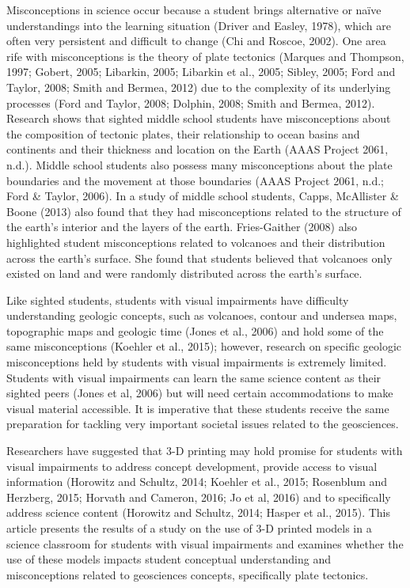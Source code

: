 \documentclass[11.5pt]{sig-alternate} %
\begin{document}
\begin{large}
Misconceptions in science occur because a student brings alternative or naïve understandings into the learning situation (Driver and Easley, 1978), which are often very persistent and difficult to change (Chi and Roscoe, 2002).  One area rife with misconceptions is the theory of plate tectonics (Marques and Thompson, 1997; Gobert, 2005; Libarkin, 2005; Libarkin et al., 2005; Sibley, 2005; Ford and Taylor, 2008; Smith and Bermea, 2012) due to the complexity of its underlying processes (Ford and Taylor, 2008; Dolphin, 2008; Smith and Bermea, 2012).  Research shows that sighted middle school students have misconceptions about the composition of tectonic plates, their relationship to ocean basins and continents and their thickness and location on the Earth (AAAS Project 2061, n.d.).  Middle school students also possess many misconceptions about the plate boundaries and the movement at those boundaries (AAAS Project 2061, n.d.; Ford \& Taylor, 2006).  In a study of middle school students, Capps, McAllister \& Boone (2013) also found that they had misconceptions related to the structure of the earth’s interior and the layers of the earth.  Fries-Gaither (2008) also highlighted student misconceptions related to volcanoes and their distribution across the earth’s surface.  She found that students believed that volcanoes only existed on land and were randomly distributed across the earth’s surface.  

Like sighted students, students with visual impairments have difficulty understanding geologic concepts, such as volcanoes, contour and undersea maps, topographic maps and geologic time (Jones et al., 2006) and hold some of the same misconceptions (Koehler et al., 2015); however, research on specific geologic misconceptions held by students with visual impairments is extremely limited.  Students with visual impairments can learn the same science content as their sighted peers (Jones et al, 2006) but will need certain accommodations to make visual material accessible.  It is imperative that these students receive the same preparation for tackling very important societal issues related to the geosciences.   

Researchers have suggested that 3-D printing may hold promise for students with visual impairments to address concept development, provide access to visual information (Horowitz and Schultz, 2014; Koehler et al., 2015; Rosenblum and Herzberg, 2015; Horvath and Cameron, 2016; Jo et al, 2016) and to specifically address science content (Horowitz and Schultz, 2014; Hasper et al., 2015). This article presents the results of a study on the use of 3-D printed models in a science classroom for students with visual impairments and examines whether the use of these models impacts student conceptual understanding and misconceptions related to geosciences concepts, specifically plate tectonics.


\end{large}
\end{document}
